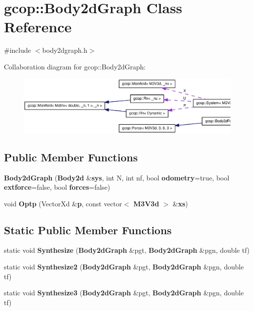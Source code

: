 \section{gcop\-:\-:\-Body2d\-Graph \-Class \-Reference}
\label{classgcop_1_1Body2dGraph}


{\ttfamily \#include $<$body2dgraph.\-h$>$}



\-Collaboration diagram for gcop\-:\-:\-Body2d\-Graph\-:\nopagebreak
\begin{figure}[H]
\begin{center}
\leavevmode
\includegraphics[width=350pt]{classgcop_1_1Body2dGraph__coll__graph}
\end{center}
\end{figure}
\subsection*{\-Public \-Member \-Functions}
\begin{DoxyCompactItemize}
\item 
{\bf \-Body2d\-Graph} ({\bf \-Body2d} \&{\bf sys}, int \-N, int nf, bool {\bf odometry}=true, bool {\bf extforce}=false, bool {\bf forces}=false)
\item 
void {\bf \-Optp} (\-Vector\-Xd \&{\bf p}, const vector$<$ {\bf \-M3\-V3d} $>$ \&{\bf xs})
\end{DoxyCompactItemize}
\subsection*{\-Static \-Public \-Member \-Functions}
\begin{DoxyCompactItemize}
\item 
static void {\bf \-Synthesize} ({\bf \-Body2d\-Graph} \&pgt, {\bf \-Body2d\-Graph} \&pgn, double tf)
\item 
static void {\bf \-Synthesize2} ({\bf \-Body2d\-Graph} \&pgt, {\bf \-Body2d\-Graph} \&pgn, double tf)
\item 
static void {\bf \-Synthesize3} ({\bf \-Body2d\-Graph} \&pgt, {\bf \-Body2d\-Graph} \&pgn, double tf)
\end{DoxyCompactItemize}
